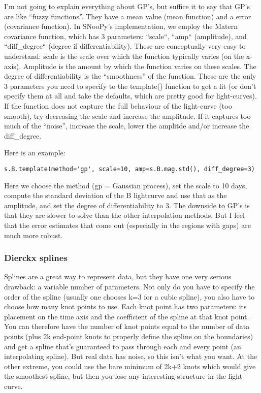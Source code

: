 I'm not going to explain everything about GP's, but suffice it to
say that GP's are like ``fuzzy functions''. They have a mean value
(mean function) and a error (covariance function). In SNooPy's implementation,
we employ the Matern covariance function, which has 3 parameters:
``scale``, ``amp`` (amplitude), and ``diff_degree``
(degree if differentiability). These are conceptually very easy to
understand: scale is the scale over which the function typically varies
(on the x-axis). Amplitude is the amount by which the function varies
on these scales. The degree of differentiability is the ``smoothness''
of the function. These are the only 3 parameters you need to specify
to the template() function to get a fit (or don't specify them at
all and take the defaults, which are pretty good for light-curves).
If the function does not capture the full behaviour of the light-curve
(too smooth), try decreasing the scale and increase the amplitude.
If it captures too much of the ``noise'', increase the scale, lower
the amplitde and/or increase the diff_degree.

Here is an example:

\begin{verbatim}
s.B.template(method='gp', scale=10, amp=s.B.mag.std(), diff_degree=3)
\end{verbatim}

Here we choose the method (\textsf{gp} = Gaussian process), set the
scale to 10 days, compute the standard deviation of the B lightcurve
and use that as the amplitude, and set the degree of differentiability
to 3. The downside to GP's is that they are slower to solve than the
other interpolation methods. But I feel that the error estimates that
come out (especially in the regions with gaps) are much more robust.


\subsubsection{Dierckx splines}

Splines are a great way to represent data, but they have one very
serious drawback: a variable number of parameters. Not only do you
have to specify the order of the spline (usually one chooses k=3 for
a cubic spline), you also have to choose how many knot points to use.
Each knot point has two parameters: its placement on the time axis
and the coefficient of the spline at that knot point. You can therefore
have the number of knot points equal to the number of data points
(plus 2k end-point knots to properly define the spline on the boundaries)
and get a spline that's guaranteed to pass through each and every
point (an interpolating spline). But real data has noise, so this
isn't what you want. At the other extreme, you could use the bare
minimum of 2k+2 knots which would give the smoothest spline, but then
you lose any interesting structure in the light-curve.


